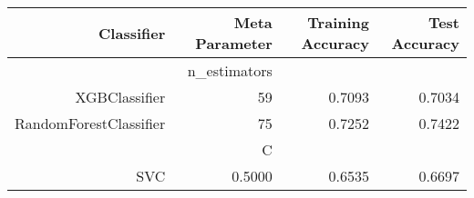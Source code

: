 \begin{tabular}{|r|r|r|r|}
    \hline
    Classifier &Meta Parameter &Training Accuracy
    &Test Accuracy\\
    \hline
    &n\_estimators &\multicolumn{2}{|r|}{}\\
    \hline
    XGBClassifier &59 &0.7093 &0.7034\\
    \hline
    RandomForestClassifier &75 &0.7252 &0.7422\\
    \hline
    &C &\multicolumn{2}{|r|}{}\\
    \hline
    SVC &0.5000 &0.6535 &0.6697\\
    \hline
\end{tabular}
